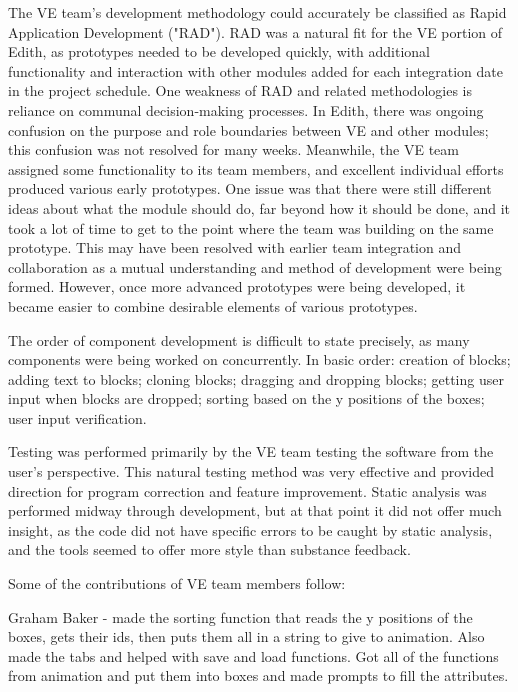 \documentclass[a4paper]{article}
\begin{document}
The VE team's development methodology could accurately be classified as Rapid Application Development ("RAD").  RAD was a natural fit for the VE portion of Edith, as prototypes needed to be developed quickly, with additional functionality and interaction with other modules added for each integration date in the project schedule.  One weakness of RAD and related methodologies is reliance on communal decision-making processes.  In Edith, there was ongoing confusion on the purpose and role boundaries between VE and other modules; this confusion was not resolved for many weeks.  Meanwhile, the VE team assigned some functionality to its team members, and excellent individual efforts produced various early prototypes.  One issue was that there were still different ideas about what the module should do, far beyond how it should be done, and it took a lot of time to get to the point where the team was building on the same prototype.  This may have been resolved with earlier team integration and collaboration as a mutual understanding and method of development were being formed.  However, once more advanced prototypes were being developed, it became easier to combine desirable elements of various prototypes.

The order of component development is difficult to state precisely, as many components were being worked on concurrently.  In basic order: creation of blocks; adding text to blocks; cloning blocks; dragging and dropping blocks; getting user input when blocks are dropped; sorting based on the y positions of the boxes; user input verification.

Testing was performed primarily by the VE team testing the software from the user's perspective.  This natural testing method was very effective and provided direction for program correction and feature improvement.  Static analysis was performed midway through development, but at that point it did not offer much insight, as the code did not have specific errors to be caught by static analysis, and the tools seemed to offer more style than substance feedback.

Some of the contributions of VE team members follow:

Graham Baker - made the sorting function that reads the y positions of the boxes, gets their ids, then puts them all in a string to give to animation. Also made the tabs and helped with save and load functions. Got all of the functions from animation and put them into boxes and made prompts to fill the attributes. 
\end{document}
